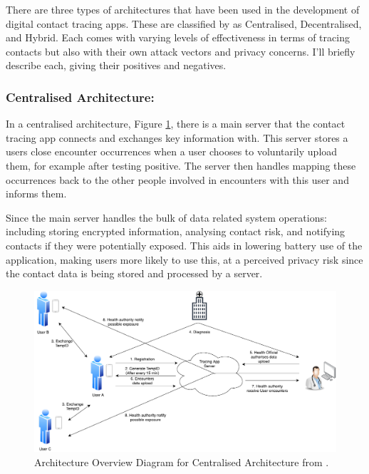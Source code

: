 \documentclass{l4proj}
\begin{document}
There are three types of architectures that have been used in the development of digital contact tracing apps. These are classified by \citet{ahmed_survey_2020} as Centralised, Decentralised, and Hybrid. Each comes with varying levels of effectiveness in terms of tracing contacts but also with their own attack vectors and privacy concerns. I'll briefly describe each, giving their positives and negatives.

\subsubsection{Centralised Architecture:}

In a centralised architecture, Figure \ref{fig:centralised_arch}, there is a main server that the contact tracing app connects and exchanges key information with. This server stores a users close encounter occurrences when a user chooses to voluntarily upload them, for example after testing positive. The server then handles mapping these occurrences back to the other people involved in encounters with this user and informs them.

Since the main server handles the bulk of data related system operations: including storing encrypted information, analysing contact risk, and notifying contacts if they were potentially exposed. This aids in lowering battery use of the application, making users more likely to use this, at a perceived privacy risk since the contact data is being stored and processed by a server.

\begin{figure}[!htb]
    \centering
    \includegraphics[width=0.8\linewidth]{images/ahmed_centralised.png}

    \caption{ Architecture Overview Diagram for Centralised Architecture from \citet{ahmed_survey_2020}.
    }

    \label{fig:centralised_arch}
\end{figure}
\end{document}
